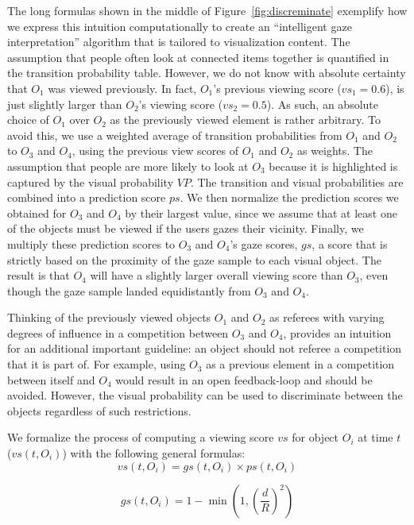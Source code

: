 The long formulas shown in the middle of Figure~\ref{fig:discreminate} exemplify how we express this intuition computationally to create an ``intelligent gaze interpretation'' algorithm that is tailored to visualization content. The assumption that people often look at connected items together is quantified in the transition probability table. However, we do not know with absolute certainty that $O_1$ was viewed previously. In fact, $O_1$'s previous viewing score ($vs_1=0.6$), is just slightly larger than $O_2$'s viewing score ($vs_2=0.5$). As such, an absolute choice of $O_1$ over $O_2$ as the previously viewed element is rather arbitrary. To avoid this, we use a weighted average of transition probabilities from $O_1$ and $O_2$ to $O_3$ and $O_4$, using the previous view scores of $O_1$ and $O_2$ as weights.  The assumption that people are more likely to look at $O_3$ because it is highlighted is captured by the visual probability $VP$. The transition and visual probabilities are combined into a prediction score $ps$. We then normalize the prediction scores we obtained for $O_3$ and $O_4$ by their largest value, since we assume that at least one of the objects must be viewed if the users gazes their vicinity. Finally, we multiply these prediction scores to $O_3$ and $O_4$'s gaze scores, $gs$, a score that is strictly based on the proximity of the gaze sample to each visual object. The result is that $O_4$ will have a slightly larger overall viewing score than $O_3$, even though the gaze sample landed equidistantly from $O_3$ and $O_4$. 

Thinking of the previously viewed objects $O_1$ and $O_2$ as referees with varying degrees of influence in a competition between $O_3$ and $O_4$, provides an intuition for an additional important guideline: an object should not referee a competition that it is part of. For example, using $O_3$ as a previous element in a competition between itself and $O_4$ would result in an open feedback-loop and should be avoided. However, the visual probability can be used to discriminate between the objects regardless of such restrictions.

We formalize the process of computing a viewing score $vs$ for object $O_i$ at time $t$  ($vs(t,O_i)$) with the following general formulas:
\begin{equation}
vs(t, O_i) = gs(t, O_i) \times ps(t, O_i)
\label{eq:VS}
\end{equation}

\begin{equation}
gs(t, O_i) = 1 - \min{(1, (\frac{d}{R})^2)}
\label{eq:GS}
\end{equation}

